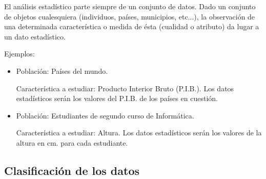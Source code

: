 \documentclass[12pt]{report}
\begin{document}
El análisis estadístico parte siempre de un conjunto de datos. Dado un conjunto de
objetos cualesquiera (individuos, países, municipios, etc...), la observación de una
determinada característica o medida de ésta  (cualidad o atributo)  da lugar a un dato
estadístico.

Ejemplos:
\begin{itemize}
\item Población: Países del mundo.

Característica a estudiar: Producto Interior Bruto (P.I.B.). Los datos estadísticos serán
los valores del P.I.B. de los países en cuestión.
\item Población: Estudiantes de segundo curso de Informática.

Característica a estudiar: Altura. Los datos estadísticos serán los valores de la altura
en cm. para cada estudiante.
\end{itemize}

\subsection{Clasificación de los datos}
\end{document}
